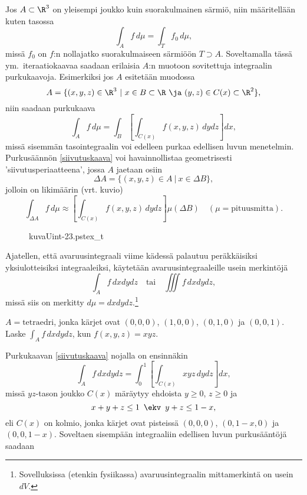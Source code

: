 Jos $A \subset \R^3$ on yleisempi joukko kuin suorakulmainen särmiö, niin määritellään kuten
tasossa
\[ 
\int_A f\,d\mu = \int_T f_0\,d\mu, 
\]
missä $f_0$ on $f$:n nollajatko suorakulmaiseen särmiöön $T \supset A$. Soveltamalla tässä 
ym.\ iteraatiokaavaa saadaan erilaisia $A$:n muotoon sovitettuja integraalin purkukaavoja.
Esimerkiksi jos $A$ esitetään muodossa
\[
A=\{(x,y,z)\in\R^3 \ | \ x\in B\subset\R \ \ja \ (y,z)\in C(x)\subset\R^2\},
\]
niin saadaan purkukaava
\begin{equation} \label{siivutuskaava}
\int_A f\,d\mu=\int_B\left[\int_{C(x)} f(x,y,z)\,dydz\right]dx, \tag{$\star$}
\end{equation}
missä sisemmän tasointegraalin voi edelleen purkaa edellisen luvun menetelmin. Purkusäännön
\eqref{siivutuskaava} voi havainnollistaa geometrisesti 'siivutusperiaatteena', jossa $A$
jaetaan osiin
\[
\Delta A=\{(x,y,z)\in A \ | \ x\in\Delta B\},
\]
jolloin on likimäärin (vrt. kuvio)
\[
\int_{\Delta A} f\,d\mu\approx\left[\int_{C(x)} f(x,y,z)\,dydz\right]\mu(\Delta B)\quad
                                                     (\mu=\text{pituusmitta}).
\]
\begin{figure}[H]
\begin{center}
{kuvaUint-23.pstex_t}
\end{center}
\end{figure}
Ajatellen, että avaruusintegraali viime kädessä palautuu peräkkäisiksi yksiulotteisiksi 
integraaleiksi, käytetään avaruusintegraaleille usein merkintöjä
\[
\int_A f\,dxdydz\quad\text{tai}\quad \iiint f\,dxdydz,
\]
missä siis on merkitty $d\mu=dxdydz$.\footnote[2]{Sovelluksissa (etenkin fysiikassa)
avaruusintegraalin mittamerkintä on usein $dV$.}
\begin{Exa}
$A=\text{tetraedri}$, jonka kärjet ovat $(0,0,0)$, $(1,0,0)$, $(0,1,0)$ ja $(0,0,1)$. Laske
$\int_A f\,dxdydz$, kun $f(x,y,z)=xyz$.
\end{Exa}
\ratk Purkukaavan \eqref{siivutuskaava} nojalla on ensinnäkin
\[
\int_A f\,dxdydz = \int_0^1\left[\int_{C(x)} xyz\,dydz\right]dx,
\]
missä $yz$-tason joukko $C(x)$ märäytyy ehdoista $y \ge 0$, $z \ge 0$ ja
\[
x+y+z \le 1\,\ \ekv\,\ y+z \le 1-x,
\]
eli $C(x)$ on kolmio, jonka kärjet ovat pisteissä $(0,0,0)$, $(0,1-x,0)$ ja $(0,0,1-x)$.
Soveltaen sisempään integraaliin edellisen luvun purkusääntöjä saadaan
